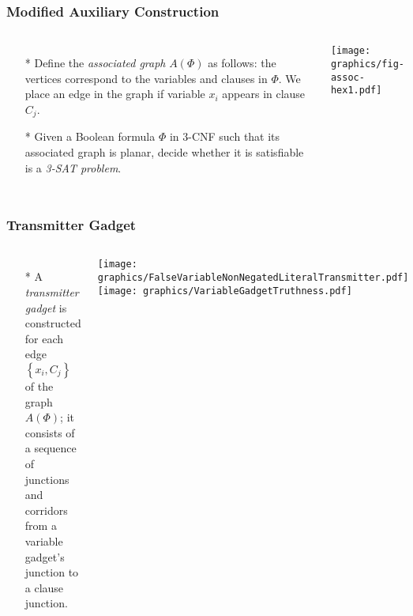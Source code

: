 \documentclass{beamer}
\begin{document}
\begin{frame} \frametitle{Modified Auxiliary Construction}
    \begin{columns}[c]
        \begin{itemize}
            \item[*] Define the \textit{associated graph} $A(\Phi)$ as follows: the vertices correspond to the variables and clauses in $\Phi$.   
We place an edge in the graph if variable $x_i$ appears in clause $C_j$.
            \item[*] Given a Boolean formula $\Phi$ in 3-CNF such that its associated graph is planar, decide whether it 
is satisfiable is a \textit{3-SAT problem}.
        \end{itemize}
        \begin{minipage}{\linewidth}
            \begin{center}
            \texttt{[image: graphics/fig-assoc-hex1.pdf]}
            \end{center}
        \end{minipage}
    \end{columns}
\end{frame}

\begin{frame} \frametitle{Transmitter Gadget}
    \begin{columns}[c]
        \begin{itemize}
            \item[*] A {\it transmitter gadget} is constructed for each edge $\left\lbrace x_i,C_j\right\rbrace$ of the graph $A(\Phi)$; it consists of a sequence of junctions and corridors from a variable gadget's junction to a clause junction.  
        \end{itemize}
        \begin{minipage}{\linewidth}
            \begin{center}
            \texttt{[image: graphics/FalseVariableNonNegatedLiteralTransmitter.pdf]}\label{gfx:FalseVariableNonNegatedLiteralTransmitter.pdf}
            \texttt{[image: graphics/VariableGadgetTruthness.pdf]}\label{gfx:VariableGadgetTruthness.pdf}
            \end{center}
        \end{minipage}
    \end{columns}
\end{frame}
\end{document}
